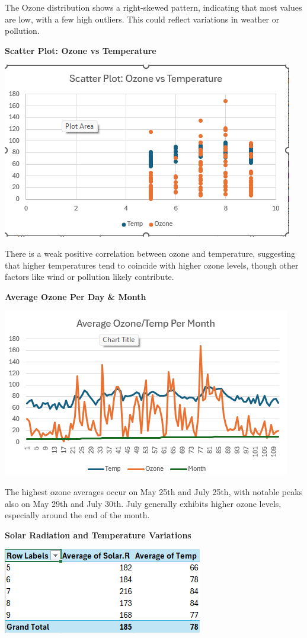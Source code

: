 \documentclass[
  letterpaper,
  DIV=11,
  numbers=noendperiod]{scrreprt}
\begin{document}
The Ozone distribution shows a right-skewed pattern, indicating that
most values are low, with a few high outliers. This could reflect
variations in weather or pollution.

\textbf{Scatter Plot: Ozone vs Temperature}

\includegraphics{scatter_ozone_vs_temp_toluwanimi.png}

There is a weak positive correlation between ozone and temperature,
suggesting that higher temperatures tend to coincide with higher ozone
levels, though other factors like wind or pollution likely contribute.

\textbf{Average Ozone Per Day \& Month}

\includegraphics{pivot4_table_toluwanimi.png}

The highest ozone averages occur on May 25th and July 25th, with notable
peaks also on May 29th and July 30th. July generally exhibits higher
ozone levels, especially around the end of the month.

\textbf{Solar Radiation and Temperature Variations}

\includegraphics{pivot1_chart_toluwanimi.png}
\end{document}
